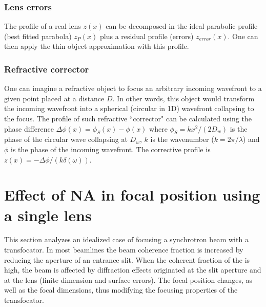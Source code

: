 \documentclass{iucr}              %
\begin{document}
\subsubsection{Lens errors}
The profile of a real lens $z(x)$ can be decomposed in the ideal parabolic profile (best fitted parabola) $z_P(x)$ plus a residual profile (errors) $z_{error}(x)$. One can then apply the thin object approximation with this profile. 

\subsubsection{Refractive corrector}
\label{sec:refractorCorrector}
One can imagine a refractive object to focus an arbitrary incoming wavefront to a given point placed at a distance $D$. In other words, this object would transform the incoming wavefront into a spherical (circular in 1D) wavefront collapsing to the focus. The profile of such refractive ``corrector"  can be calculated using the phase difference $\Delta\phi(x)=\phi_S(x)-\phi(x)$ where $\phi_S=k x^2 / (2 D_w)$ is the phase of the circular wave collapsing at $D_w$, $k$ is the wavenumber ($k=2\pi/\lambda$) and $\phi$ is the phase of the incoming wavefront. The corrective profile is $z(x)=-\Delta\phi/(k \delta(\omega))$.



\section{Effect of NA in focal position using a single lens}

This section analyzes an idealized case of focusing a synchrotron beam with a transfocator. In most beamlines the beam coherence fraction is increased by reducing the aperture of an entrance slit. When the coherent fraction of the is high, the beam is affected by diffraction effects originated at the slit aperture and at the lens (finite dimension and surface errors). The focal position changes, as well as the focal dimensions, thus modifying the focusing properties of the transfocator. 
\end{document}
